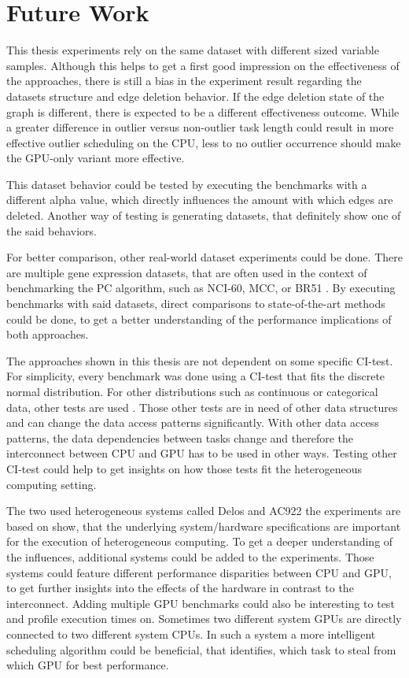 \chapter{Future Work}
This thesis experiments rely on the same dataset with different sized variable samples. Although this helps to get a first good impression on the effectiveness of the approaches, there is still a bias in the experiment result regarding the datasets structure and edge deletion behavior. If the edge deletion state of the graph is different, there is expected to be a different effectiveness outcome. While a greater difference in outlier versus non-outlier task length could result in more effective outlier scheduling on the CPU, less to no outlier occurrence should make the GPU-only variant more effective.

This dataset behavior could be tested by executing the benchmarks with a different alpha value, which directly influences the amount with which edges are deleted. Another way of testing is generating datasets, that definitely show one of the said behaviors.

For better comparison, other real-world dataset experiments could be done. There are multiple gene  expression datasets, that are often used in the context of benchmarking the PC algorithm, such as NCI-60, MCC, or BR51 \cite{leFastPCAlgorithm2019}. By executing benchmarks with said datasets, direct comparisons to state-of-the-art methods could be done, to get a better understanding of the performance implications of both approaches.

The approaches shown in this thesis are not dependent on some specific CI-test. For simplicity, every benchmark was done using a CI-test that fits the discrete normal distribution. For other distributions such as continuous or categorical data, other tests are used \cite{scutariLearningBayesianNetworks2010}. Those other tests are in need of other data structures and can change the data access patterns significantly. With other data access patterns, the data dependencies between tasks change and therefore the interconnect between CPU and GPU has to be used in other ways. Testing other CI-test could help to get insights on how those tests fit the heterogeneous computing setting.

The two used heterogeneous systems called Delos and AC922 the experiments are based on show, that the underlying system/hardware specifications are important for the execution of heterogeneous computing. To get a deeper understanding of the influences, additional systems could be added to the experiments. Those systems could feature different performance disparities between CPU and GPU, to get further insights into the effects of the hardware in contrast to the interconnect. Adding multiple GPU benchmarks could also be interesting to test and profile execution times on. Sometimes two different system GPUs are directly connected to two different system CPUs. In such a system a more intelligent scheduling algorithm could be beneficial, that identifies, which task to steal from which GPU for best performance.

